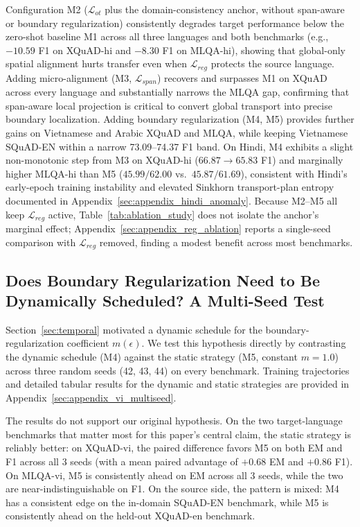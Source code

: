\documentclass[11pt]{article}
\begin{document}
Configuration M2 ($\mathcal{L}_{ot}$ plus the domain-consistency anchor, without span-aware or boundary regularization) consistently degrades target performance below the zero-shot baseline M1 across all three languages and both benchmarks (e.g., $-10.59$ F1 on XQuAD-hi and $-8.30$ F1 on MLQA-hi), showing that global-only spatial alignment hurts transfer even when $\mathcal{L}_{reg}$ protects the source language. Adding micro-alignment (M3, $\mathcal{L}_{span}$) recovers and surpasses M1 on XQuAD across every language and substantially narrows the MLQA gap, confirming that span-aware local projection is critical to convert global transport into precise boundary localization. Adding boundary regularization (M4, M5) provides further gains on Vietnamese and Arabic XQuAD and MLQA, while keeping Vietnamese SQuAD-EN within a narrow 73.09--74.37 F1 band. On Hindi, M4 exhibits a slight non-monotonic step from M3 on XQuAD-hi ($66.87 \rightarrow 65.83$ F1) and marginally higher MLQA-hi than M5 ($45.99/62.00$ vs.\ $45.87/61.69$), consistent with Hindi's early-epoch training instability and elevated Sinkhorn transport-plan entropy documented in Appendix~\ref{sec:appendix_hindi_anomaly}. Because M2--M5 all keep $\mathcal{L}_{reg}$ active, Table~\ref{tab:ablation_study} does not isolate the anchor's marginal effect; Appendix~\ref{sec:appendix_reg_ablation} reports a single-seed comparison with $\mathcal{L}_{reg}$ removed, finding a modest benefit across most benchmarks.

\subsection{Does Boundary Regularization Need to Be Dynamically Scheduled? A Multi-Seed Test}
\label{sec:margin_impact}

Section~\ref{sec:temporal} motivated a dynamic schedule for the boundary-regularization coefficient $m(\epsilon)$. We test this hypothesis directly by contrasting the dynamic schedule (M4) against the static strategy (M5, constant $m=1.0$) across three random seeds (42, 43, 44) on every benchmark. Training trajectories and detailed tabular results for the dynamic and static strategies are provided in Appendix~\ref{sec:appendix_vi_multiseed}.

The results do not support our original hypothesis. On the two target-language benchmarks that matter most for this paper's central claim, the static strategy is reliably better: on XQuAD-vi, the paired difference favors M5 on both EM and F1 across all 3 seeds (with a mean paired advantage of $+0.68$ EM and $+0.86$ F1). On MLQA-vi, M5 is consistently ahead on EM across all 3 seeds, while the two are near-indistinguishable on F1. On the source side, the pattern is mixed: M4 has a consistent edge on the in-domain SQuAD-EN benchmark, while M5 is consistently ahead on the held-out XQuAD-en benchmark. 
\end{document}
